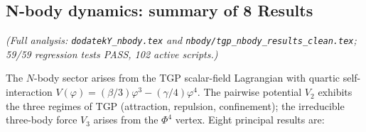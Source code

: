 \subsection{N-body dynamics: summary of 8 Results}%
\label{ssec:nbody-summary}

\noindent\textit{(Full analysis: \texttt{dodatekY\_nbody.tex} and
\texttt{nbody/tgp\_nbody\_results\_clean.tex}; 59/59 regression
tests PASS, 102 active scripts.)}

\medskip
The $N$-body sector arises from the TGP scalar-field Lagrangian
with quartic self-interaction $V(\varphi)
=(\beta/3)\varphi^{3}-(\gamma/4)\varphi^{4}$.  The pairwise
potential $V_{2}$ exhibits the three regimes of TGP (attraction,
repulsion, confinement); the irreducible three-body force $V_{3}$
arises from the $\Phi^{4}$ vertex.  Eight principal results are:

